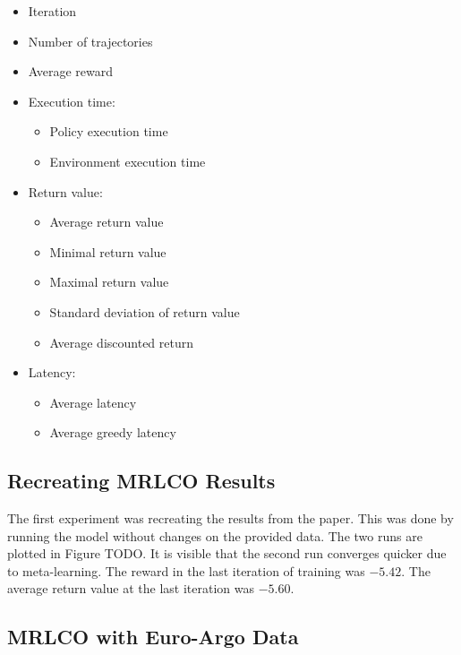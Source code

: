 \begin{itemize}[noitemsep]
    \item Iteration
    \item Number of trajectories
    \item Average reward
    \item Execution time:
        \begin{itemize}[noitemsep]
            \item Policy execution time
            \item Environment execution time
        \end{itemize}
    \item Return value:
        \begin{itemize}[noitemsep]
            \item Average return value
            \item Minimal return value
            \item Maximal return value
            \item Standard deviation of return value
            \item Average discounted return
        \end{itemize}
    \item Latency:
        \begin{itemize}[noitemsep]
            \item Average latency
            \item Average greedy latency
        \end{itemize}
\end{itemize}





\subsection{Recreating MRLCO Results}

The first experiment was recreating the results from the paper. This was done
by running the \mrlco model without changes on the provided data. The two runs
are plotted in Figure \large{TODO}\normalsize. It is visible that the second run
converges quicker due to meta-learning. The reward in the last iteration of
training was $-5.42$. The average return value at the last iteration was
$-5.60$.


\subsection{MRLCO with Euro-Argo Data}

